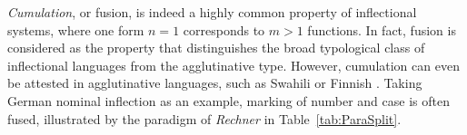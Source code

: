 \documentclass[output=paper]{langscibook}
\begin{document}
\emph{Cumulation}, or fusion, is indeed a highly common property of
inflectional systems, where one form $n=1$ corresponds to $m>1$
functions. In fact, fusion is considered as the property that
distinguishes the broad typological class of inflectional languages
from the agglutinative type. However, cumulation can even be attested
in agglutinative languages, such as Swahili \citep{Stump93} or Finnish
\citep{Spencer:03:Morphology}.  Taking German nominal inflection as an
example, marking of number and case is often fused, illustrated by the
paradigm of \textit{Rechner} in Table~\ref{tab:ParaSplit}.

\begin{table}  
  

\end{table}
\end{document}
